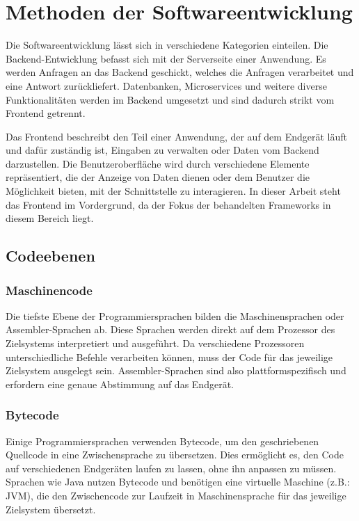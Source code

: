 \section{Methoden der Softwareentwicklung}
Die Softwareentwicklung lässt sich in verschiedene Kategorien einteilen. Die Backend-Entwicklung befasst sich mit der Serverseite einer Anwendung. Es werden Anfragen an das Backend geschickt, welches die Anfragen verarbeitet und eine Antwort zurückliefert. Datenbanken, Microservices und weitere diverse Funktionalitäten werden im Backend umgesetzt und sind dadurch strikt vom Frontend getrennt.

\vspace{0.5cm}

Das Frontend beschreibt den Teil einer Anwendung, der auf dem Endgerät läuft und dafür zuständig ist, Eingaben zu verwalten oder Daten vom Backend darzustellen. Die Benutzeroberfläche wird durch verschiedene Elemente repräsentiert, die der Anzeige von Daten dienen oder dem Benutzer die Möglichkeit bieten, mit der Schnittstelle zu interagieren. In dieser Arbeit steht das Frontend im Vordergrund, da der Fokus der behandelten Frameworks in diesem Bereich liegt.

\vspace{0.5cm}

\subsection{Codeebenen}
\subsubsection{Maschinencode}

Die tiefste Ebene der Programmiersprachen bilden die Maschinensprachen oder Assembler-Sprachen ab. Diese Sprachen werden direkt auf dem Prozessor des Zielsystems interpretiert und ausgeführt. Da verschiedene Prozessoren unterschiedliche Befehle verarbeiten können, muss der Code für das jeweilige Zielsystem ausgelegt sein. Assembler-Sprachen sind also plattformspezifisch und erfordern eine genaue Abstimmung auf das Endgerät.

\vspace{0.5cm}

\subsubsection{Bytecode}

Einige Programmiersprachen verwenden Bytecode, um den geschriebenen Quellcode in eine Zwischensprache zu übersetzen. Dies ermöglicht es, den Code auf verschiedenen Endgeräten laufen zu lassen, ohne ihn anpassen zu müssen. Sprachen wie Java nutzen Bytecode und benötigen eine virtuelle Maschine (z.B.: JVM), die den Zwischencode zur Laufzeit in Maschinensprache für das jeweilige Zielsystem übersetzt.

